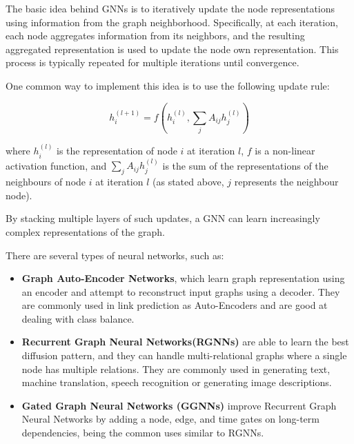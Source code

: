 The basic idea behind \acp{GNN} is to iteratively update the node representations using information from the graph neighborhood. Specifically, at each iteration, each node aggregates information from its neighbors, and the resulting aggregated representation is used to update the node own representation. This process is typically repeated for multiple iterations until convergence. %

One common way to implement this idea is to use the following update rule:

\begin{equation}
h_i^{(l+1)} = f(h_i^{(l)}, \sum_{j} A_{ij} h_j^{(l)})
\end{equation}

where $h_i^{(l)}$ is the representation of node $i$ at iteration $l$, $f$ is a non-linear activation function, and $\sum_{j} A_{ij} h_j^{(l)}$ is the sum of the representations of the neighbours of node $i$ at iteration $l$ (as stated above, $j$ represents the neighbour node).

By stacking multiple layers of such updates, a GNN can learn increasingly complex representations of the graph.

There are several types of neural networks, such as:

\begin{itemize}
	
	\item \textbf{Graph Auto-Encoder Networks}, which learn graph representation using an encoder and attempt to reconstruct input graphs using a decoder. They are commonly used in link prediction as Auto-Encoders and are good at dealing with class balance. 
	
	\item \textbf{Recurrent Graph Neural Networks(RGNNs)} are able to learn the best diffusion pattern, and they can handle multi-relational graphs where a single node has multiple relations. They are commonly used in generating text, machine translation, speech recognition or generating image descriptions.
	
	\item \textbf{Gated Graph Neural Networks (GGNNs)} improve Recurrent Graph Neural Networks by adding a node, edge, and time gates on long-term dependencies, being the common uses similar to RGNNs.
	
\end{itemize}

